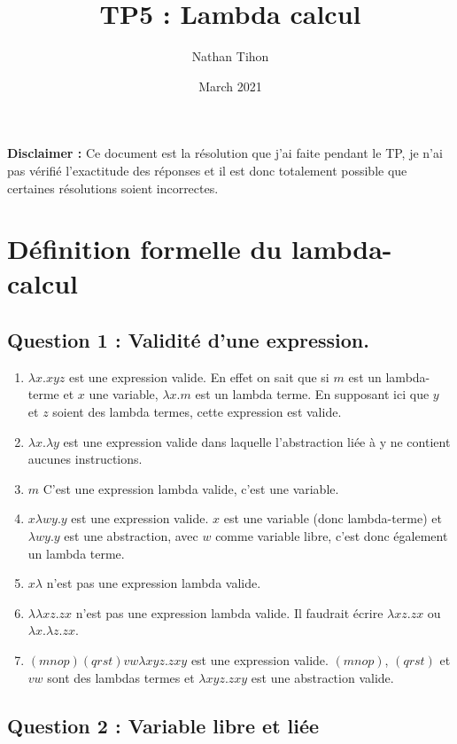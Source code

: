 \documentclass{article}
\title{TP5 : Lambda calcul}
\author{Nathan Tihon}
\date{March 2021}
\begin{document}
\textbf{Disclaimer :} Ce document est la résolution que j'ai faite pendant le TP, je n'ai pas vérifié l'exactitude des réponses et il est donc totalement possible que certaines résolutions soient incorrectes.

\section{Définition formelle du lambda-calcul}

\subsection{Question 1 : Validité d'une expression.}
\begin{enumerate}
    \item $\lambda x.xyz $ est une expression valide. En effet on sait que si $m$ est un lambda-terme et $x$ une variable, $\lambda x.m$ est un lambda terme. En supposant ici que $y$ et $z$ soient des lambda termes, cette expression est valide. \\
    \item $\lambda x.\lambda y$ est une expression valide dans laquelle l'abstraction liée à y ne contient aucunes instructions. \\
    \item $m$ C'est une expression lambda valide, c'est une variable. \\
    \item $x\lambda wy.y$ est une expression valide. $x$ est une variable (donc lambda-terme) et $\lambda wy.y$ est une abstraction, avec $w$ comme variable libre, c'est donc également un lambda terme. \\
    \item $x\lambda$ n'est pas une expression lambda valide. \\
    \item $\lambda \lambda xz.zx$ n'est pas une expression lambda valide. Il faudrait écrire $\lambda xz.zx$ ou $\lambda x.\lambda z.zx$. \\
    \item $(mnop)(qrst)vw\lambda xyz.zxy$ est une expression valide. $(mnop)$, $(qrst)$ et $vw$ sont des lambdas termes et $\lambda xyz.zxy$ est une abstraction valide.
\end{enumerate}

\subsection{Question 2 : Variable libre et liée}
\end{document}
